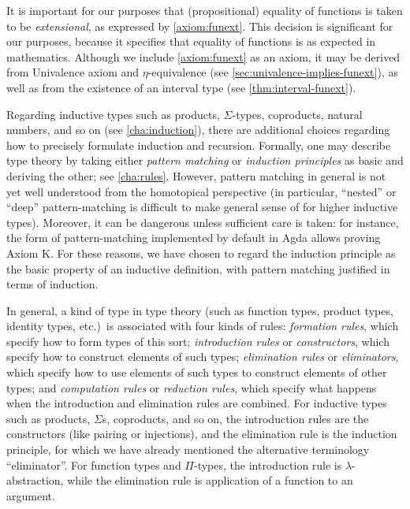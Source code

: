 It is important for our purposes that (propositional) equality of functions is taken to be \emph{extensional}, as expressed by \autoref{axiom:funext}.  This decision is significant for our purposes, because it specifies that equality of functions is as expected in mathematics.  Although we include \autoref{axiom:funext} as an axiom, it may be derived from Univalence axiom and $\eta$-equivalence (see \autoref{sec:univalence-implies-funext}), as well as from the existence of an interval type (see \autoref{thm:interval-funext}).

Regarding inductive types such as products, $\Sigma$-types, coproducts, natural numbers, and so on (see \autoref{cha:induction}), there are additional choices regarding how to precisely formulate induction and recursion.
Formally, one may describe type theory by taking either \emph{pattern matching} or \emph{induction principles} as basic and deriving the other; see \autoref{cha:rules}.
However, pattern matching in general is not yet well understood from the homotopical perspective (in particular, ``nested'' or ``deep'' pattern-matching is difficult to make general sense of for higher inductive types).
Moreover, it can be dangerous unless sufficient care is taken: for instance, the form of pattern-matching implemented by default in Agda allows proving Axiom K.
For these reasons, we have chosen to regard the induction principle as the basic property of an inductive definition, with pattern matching justified in terms of induction.

In general, a kind of type in type theory (such as function types, product types, identity types, etc.)\ is associated with four kinds of rules: \emph{formation rules}, which specify how to form types of this sort; \emph{introduction rules}  or \emph{constructors}, which specify how to construct elements of such types; \emph{elimination rules} or \emph{eliminators}, which specify how to use elements of such types to construct elements of other types; and \emph{computation rules} or \emph{reduction rules}, which specify what happens when the introduction and elimination rules are combined.
For inductive types such as products, $\Sigma$s, coproducts, and so on, the introduction rules are the constructors (like pairing or injections), and the elimination rule is the induction principle, for which we have already mentioned the alternative terminology ``eliminator''.
For function types and $\Pi$-types, the introduction rule is $\lambda$-abstraction, while the elimination rule is application of a function to an argument.

